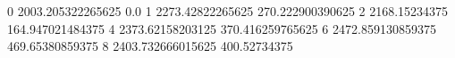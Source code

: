 0 2003.205322265625 0.0
1 2273.42822265625 270.222900390625
2 2168.15234375 164.947021484375
4 2373.62158203125 370.416259765625
6 2472.859130859375 469.65380859375
8 2403.732666015625 400.52734375
